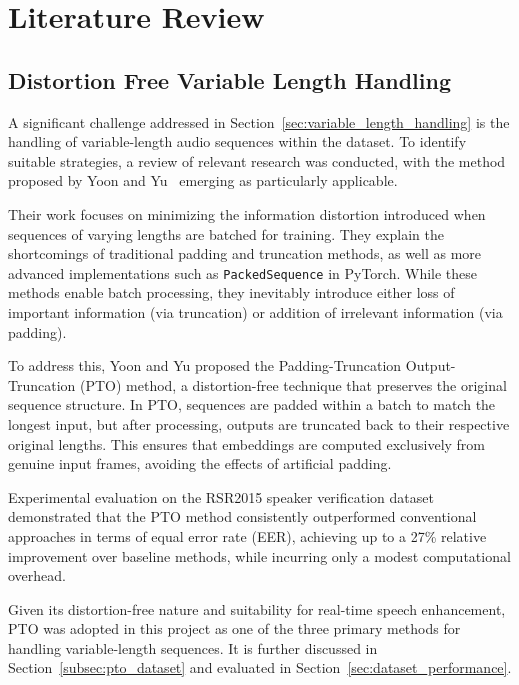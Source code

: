 \graphicspath{{content/chapters/3_literature/figures/}}
\chapter{Literature Review}
\label{sec:literature_review}

\section{Distortion Free Variable Length Handling} 
\label{sec:distortion_free_handling}

A significant challenge addressed in Section~\ref{sec:variable_length_handling} is the handling of variable-length audio sequences within the dataset. To identify suitable strategies, a review of relevant research was conducted, with the method proposed by Yoon and Yu~\cite{yoon2020pto} emerging as particularly applicable.

Their work focuses on minimizing the information distortion introduced when sequences of varying lengths are batched for training. They explain the shortcomings of traditional padding and truncation methods, as well as more advanced implementations such as \texttt{PackedSequence} in PyTorch. While these methods enable batch processing, they inevitably introduce either loss of important information (via truncation) or addition of irrelevant information (via padding).

To address this, Yoon and Yu proposed the Padding-Truncation Output-Truncation (PTO) method, a distortion-free technique that preserves the original sequence structure. In PTO, sequences are padded within a batch to match the longest input, but after processing, outputs are truncated back to their respective original lengths. This ensures that embeddings are computed exclusively from genuine input frames, avoiding the effects of artificial padding.

Experimental evaluation on the RSR2015 speaker verification dataset demonstrated that the PTO method consistently outperformed conventional approaches in terms of equal error rate (EER), achieving up to a 27\% relative improvement over baseline methods, while incurring only a modest computational overhead.

Given its distortion-free nature and suitability for real-time speech enhancement, PTO was adopted in this project as one of the three primary methods for handling variable-length sequences. It is further discussed in Section~\ref{subsec:pto_dataset} and evaluated in Section~\ref{sec:dataset_performance}.

